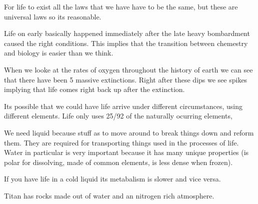 \documentclass{article}
\begin{document}

For life to exist all the laws that we have have to be the same, but these are universal laws so its reasonable.


Life on early basically happened immediately after the late heavy bombardment caused the right conditions. This implies that the transition between chemestry and biology is easier than we think.


When we looke at the rates of oxygen throughout the history of earth we can see that there have been 5 massive extinctions. Right after these dips we see spikes implying that life comes right back up after the extinction.





Its possible that we could have life arrive under different circumstances, using different elements. Life only uses 25/92 of the naturally ocurring elements,


We need liquid because stuff as to move around to break things down and reform them. They are required for transporting things used in the processes of life. Water in particular is very important because it has many unique properties (is polar for dissolving, made of common elements, is less dense when frozen).


If you have life in a cold liquid its metabalism is slower and vice versa.


Titan has rocks made out of water and an nitrogen rich atmosphere.


\end{document}
